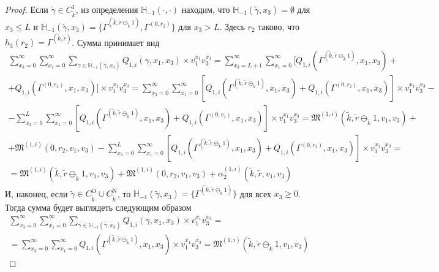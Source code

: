 \documentclass[a4paper,12pt,russian]{extarticle}
\begin{document}
\begin{proof}
Если $\tilde{\gamma} \in C_{\tilde{k}}^{\mathrm{I}}$, из определения  ${\mathbb H}_{-1}(\cdot,\cdot)$ находим, что ${\mathbb H}_{-1}(\tilde{\gamma},x_3) = \emptyset$ для $x_3 \leqslant L$ и ${\mathbb H}_{-1}(\tilde{\gamma},x_3) = \{\Gamma^{(\tilde{k},\tilde{r}\ominus_{\tilde{k}} 1)}, \Gamma^{(0,r_2)}\}$ для $x_3 > L$. Здесь $r_2$ таково, что $h_3(r_2)=\Gamma^{(\tilde{k},\tilde{r})}$. Сумма принимает вид
\begin{multline*}
      \sum_{x_3=0}^{\infty} \sum_{x_1=0}^{\infty}  \sum_{\gamma \in {\mathbb H}_{-1}(\tilde{\gamma},x_3)}Q_{1,i}(\gamma,x_1, x_3) 
    \times v_1^{x_1} v_3^{x_3} =  \sum_{x_3=L+1}^{\infty} \sum_{x_1=0}^{\infty} [ Q_{1,i}(\Gamma^{(\tilde{k},\tilde{r}\ominus_{\tilde{k}} 1)},x_1, x_3) + \\ 
    +Q_{1,i}(  \Gamma^{(0,r_2)},x_1, x_3) ] \times v_1^{x_1} v_3^{x_3} = 
    \sum_{x_3=0}^{\infty} \sum_{x_1=0}^{\infty} [ Q_{1,i}(\Gamma^{(\tilde{k},\tilde{r}\ominus_{\tilde{k}} 1)},x_1, x_3) +Q_{1,i}(  \Gamma^{(0,r_2)},x_1, x_3) ]  \times v_1^{x_1} v_3^{x_3} - \\
    -\sum_{x_3=0}^{L} \sum_{x_1=0}^{\infty} [ Q_{1,i}(\Gamma^{(\tilde{k},\tilde{r}\ominus_{\tilde{k}} 1)},x_1, x_3) +Q_{1,i}(  \Gamma^{(0,r_2)},x_1, x_3) ]  \times v_1^{x_1} v_3^{x_3} 
    = \mathfrak{M}^{(1,i)}(\tilde{k},\tilde{r}\ominus_{\tilde{k}} 1,v_1,v_3)  + \\
    +\mathfrak{M}^{(1,i)}(0,r_2,v_1,v_3) -\sum_{x_3=0}^{L} \sum_{x_1=0}^{\infty} [ Q_{1,i}(\Gamma^{(\tilde{k},\tilde{r}\ominus_{\tilde{k}} 1)},x_1, x_3) +Q_{1,i}(  \Gamma^{(0,r_2)},x_1, x_3) ]  \times v_1^{x_1} v_3^{x_3} = \\
    =  \mathfrak{M}^{(1,i)}(\tilde{k},\tilde{r}\ominus_{\tilde{k}} 1,v_1,v_3) 
    +\mathfrak{M}^{(1,i)}(0,r_2,v_1,v_3)  + \alpha_2^{(1,i)}(\tilde{k},\tilde{r},v_1,v_3)
\end{multline*}
И, наконец, если $\tilde{\gamma}\in C_{\tilde{k}}^{\mathrm{O}} \cup C_{\tilde{k}}^{\mathrm{N}}$, то ${\mathbb H}_{-1}(\tilde{\gamma},x_3) = \{\Gamma^{(\tilde{k},\tilde{r}\ominus_{\tilde{k}} 1)}\}$ для всех $x_3\geqslant 0$. Тогда сумма будет выглядеть следующим образом
\begin{multline*}
      \sum_{x_3=0}^{\infty} \sum_{x_1=0}^{\infty}  \sum_{\gamma \in {\mathbb H}_{-1}(\tilde{\gamma},x_3)}Q_{1,i}(\gamma,x_1, x_3) 
    \times v_1^{x_1} v_3^{x_3} =\\
    =   \sum_{x_3=0}^{\infty} \sum_{x_1=0}^{\infty} Q_{1,i}(\Gamma^{(\tilde{k},\tilde{r}\ominus_{\tilde{k}} 1)},x_1, x_3) 
    \times v_1^{x_1} v_3^{x_3}
    = \mathfrak{M}^{(1,i)}(\tilde{k},\tilde{r}\ominus_{\tilde{k}} 1,v_1,v_3) 
\end{multline*}


\end{proof}
\end{document}
